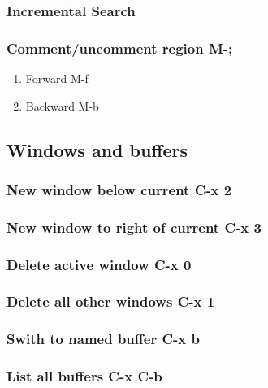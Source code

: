 \documentclass[11pt]{article}
\begin{document}
\subsubsection{Incremental Search}
\label{sec:org13f926e}

\subsubsection{Comment/uncomment region M-;}
\label{sec:org02d9ca9}

\begin{enumerate}
\item Forward M-f
\label{sec:org2041f42}

\item Backward M-b
\label{sec:org05fd88c}
\end{enumerate}

\subsection{Windows and buffers}
\label{sec:org7aba90a}

\subsubsection{New window below current C-x 2}
\label{sec:orgc5f6950}

\subsubsection{New window to right of current C-x 3}
\label{sec:org3232acb}

\subsubsection{Delete active window C-x 0}
\label{sec:orgdbcd19d}

\subsubsection{Delete all other windows C-x 1}
\label{sec:org87dba72}

\subsubsection{Swith to named buffer C-x b}
\label{sec:orgf4391fc}

\subsubsection{List all buffers C-x C-b}
\label{sec:org6ae32a1}
\end{document}
